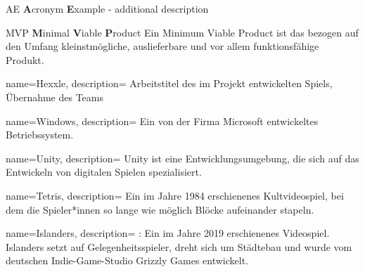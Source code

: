 %
%


\usepackage{xparse}

 {
	\makeglossaries
}





	{AE}
	{\textbf{A}cronym \textbf{E}xample - additional description}




	{MVP}
	{\textbf{M}inimal \textbf{V}iable \textbf{P}roduct}
	{
		Ein Minimum Viable Product ist das bezogen auf den Umfang kleinstmögliche, auslieferbare und vor allem funktionsfähige Produkt.
	}



{
	name=Hexxle,
	description={
		Arbeitstitel des im Projekt entwickelten Spiels, Übernahme des Teams
	}
}

{
	name=Windows,
	description={
		Ein von der Firma Microsoft entwickeltes Betriebssystem.
	}
}

{
	name=Unity,
	description={
		Unity ist eine Entwicklungsumgebung, die sich auf das Entwickeln von digitalen Spielen spezialisiert.
	}
}

{
	name=Tetris,
	description={
		Ein im Jahre 1984 erschienenes Kultvideospiel, bei dem die Spieler*innen so lange wie möglich Blöcke aufeinander stapeln.
	}
}

{
	name=Islanders,
	description={
		\cite{IslandersWiki}: Ein im Jahre 2019 erschienenes Videospiel. Islanders setzt auf Gelegenheitsspieler, dreht sich um Städtebau und wurde vom deutschen Indie-Game-Studio Grizzly Games entwickelt.
	}
}

